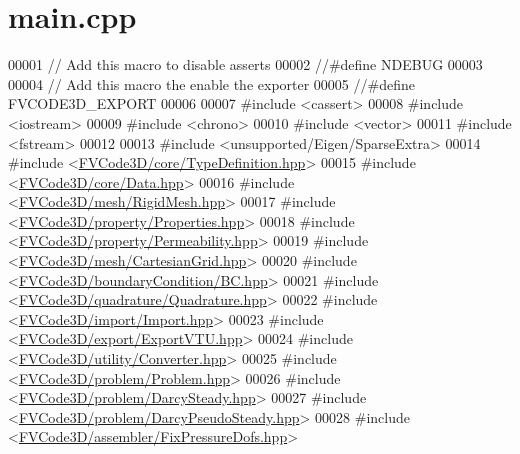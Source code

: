 \hypertarget{main_8cpp_source}{}\section{main.\+cpp}
\label{main_8cpp_source}

\begin{DoxyCode}
00001 \textcolor{comment}{// Add this macro to disable asserts}
00002 \textcolor{comment}{//#define NDEBUG}
00003 
00004 \textcolor{comment}{// Add this macro the enable the exporter}
00005 \textcolor{comment}{//#define FVCODE3D\_EXPORT}
00006 
00007 \textcolor{preprocessor}{#include <cassert>}
00008 \textcolor{preprocessor}{#include <iostream>}
00009 \textcolor{preprocessor}{#include <chrono>}
00010 \textcolor{preprocessor}{#include <vector>}
00011 \textcolor{preprocessor}{#include <fstream>}
00012 
00013 \textcolor{preprocessor}{#include <unsupported/Eigen/SparseExtra>}
00014 \textcolor{preprocessor}{#include <\hyperlink{TypeDefinition_8hpp}{FVCode3D/core/TypeDefinition.hpp}>}
00015 \textcolor{preprocessor}{#include <\hyperlink{Data_8hpp}{FVCode3D/core/Data.hpp}>}
00016 \textcolor{preprocessor}{#include <\hyperlink{RigidMesh_8hpp}{FVCode3D/mesh/RigidMesh.hpp}>}
00017 \textcolor{preprocessor}{#include <\hyperlink{Properties_8hpp}{FVCode3D/property/Properties.hpp}>}
00018 \textcolor{preprocessor}{#include <\hyperlink{Permeability_8hpp}{FVCode3D/property/Permeability.hpp}>}
00019 \textcolor{preprocessor}{#include <\hyperlink{CartesianGrid_8hpp}{FVCode3D/mesh/CartesianGrid.hpp}>}
00020 \textcolor{preprocessor}{#include <\hyperlink{BC_8hpp}{FVCode3D/boundaryCondition/BC.hpp}>}
00021 \textcolor{preprocessor}{#include <\hyperlink{Quadrature_8hpp}{FVCode3D/quadrature/Quadrature.hpp}>}
00022 \textcolor{preprocessor}{#include <\hyperlink{Import_8hpp}{FVCode3D/import/Import.hpp}>}
00023 \textcolor{preprocessor}{#include <\hyperlink{ExportVTU_8hpp}{FVCode3D/export/ExportVTU.hpp}>}
00024 \textcolor{preprocessor}{#include <\hyperlink{Converter_8hpp}{FVCode3D/utility/Converter.hpp}>}
00025 \textcolor{preprocessor}{#include <\hyperlink{Problem_8hpp}{FVCode3D/problem/Problem.hpp}>}
00026 \textcolor{preprocessor}{#include <\hyperlink{DarcySteady_8hpp}{FVCode3D/problem/DarcySteady.hpp}>}
00027 \textcolor{preprocessor}{#include <\hyperlink{DarcyPseudoSteady_8hpp}{FVCode3D/problem/DarcyPseudoSteady.hpp}>}
00028 \textcolor{preprocessor}{#include <\hyperlink{FixPressureDofs_8hpp}{FVCode3D/assembler/FixPressureDofs.hpp}>}

\end{DoxyCode}

